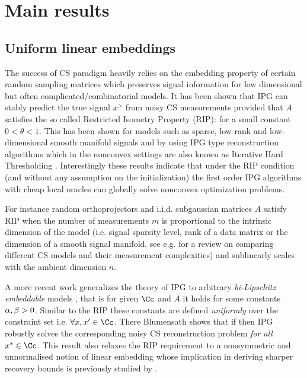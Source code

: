 \section{Main results}
\label{sec:main}
\subsection{Uniform linear embeddings}
The success of CS paradigm heavily relies  on 
the embedding property of certain random sampling matrices which preserves signal information for low dimensional but often complicated/combinatorial models. It has been shown that IPG can stably predict the true signal $x^\gt$ from noisy CS measurements provided that $A$ satisfies the so called Restricted Isometry Property (RIP): 
for a small constant  $0<\theta<1$.
This has been shown for models such as sparse, low-rank and low-dimensional smooth manifold signals and by using 
IPG type reconstruction 
algorithms which in the nonconvex settings are also known as Iterative Hard Thresholding \cite{IHTCS, Ma2011, AIHT,MIP, modelbasedCS}. Interestingly these results indicate that under the RIP condition (and without any assumption on the initialization) the first order IPG algorithms with cheap local oracles can globally solve
nonconvex optimization problems. 

For instance random orthoprojectors and i.i.d. subgaussian matrices $A$ satisfy RIP when the number of measurements $m$ is proportional to the intrinsic dimension of the model (i.e. signal sparsity level, rank of a data matrix or the dimension of a smooth signal manifold, see e.g. \cite{RichCSreview} for a review on comparing different CS models and their measurement complexities) and sublinearly scales with the ambient dimension $n$. 

A more recent work generalizes the theory of IPG to arbitrary \emph{bi-Lipschitz embeddable} models \cite{Blumen}, that is for given $\Cc$ and $A$ it holds
for some constants $\alpha, \beta >0$. Similar to the RIP these constants are defined \emph{uniformly} over the constraint set i.e. $\forall x,x'\in \Cc$. There Blumensath shows that if \eq{\MM<1.5\mm,} then IPG robustly solves the corresponding noisy CS reconstruction problem \emph{for all} $x^\gt\in \Cc$. This result also relaxes the RIP requirement to a nonsymmetric and unnormalised notion of linear embedding whose implication in deriving sharper recovery bounds is previously studied by \cite{JaredJeff}. 

